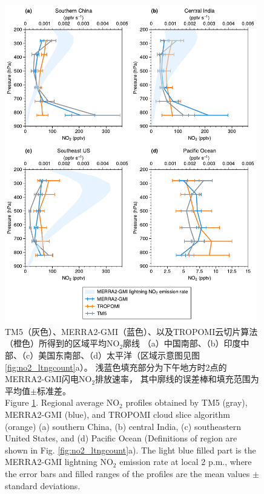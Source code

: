\begin{figure}[!htbp]
    \centering
    \includegraphics[width=11cm]{./figures/utno2_profile.pdf}
    \caption{
    TM5（灰色）、MERRA2-GMI（蓝色）、以及TROPOMI云切片算法（橙色）所得到的区域平均NO$_2$廓线
    （a）中国南部、（b）印度中部、（c）美国东南部、（d）太平洋（区域示意图见图\ref{fig:no2_ltngcount}a）。
    浅蓝色填充部分为下午地方时2点的MERRA2-GMI闪电NO$_2$排放速率，
    其中廓线的误差棒和填充范围为平均值$\pm$标准差。\\
    Figure \ref{fig:utno2_profile}. Regional average NO$_2$ profiles obtained by TM5 (gray), MERRA2-GMI (blue), and TROPOMI cloud slice algorithm (orange)
    (a) southern China, (b) central India, (c) southeastern United States, and (d) Pacific Ocean
    (Definitions of region are shown in Fig. \ref{fig:no2_ltngcount}a).
    The light blue filled part is the MERRA2-GMI lightning NO$_2$ emission rate at local 2 p.m.,
    where the error bars and filled ranges of the profiles are the mean values $\pm$ standard deviations.
    }
    \label{fig:utno2_profile}
\end{figure}
\FloatBarrier


